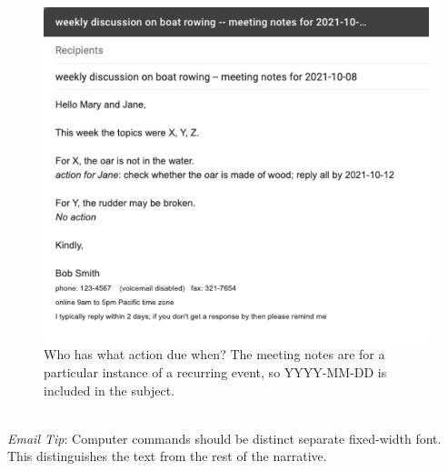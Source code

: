 \begin{figure}
\includegraphics[width=1\textwidth]{images/email_meeting_notes.pdf}
\caption{Who has what action due when? The meeting notes are for a particular instance of a recurring event, so YYYY-MM-DD is included in the subject.}
\label{fig:email_meeting_notes}
\end{figure}

\ \\
\textit{Email Tip}: Computer commands should be distinct separate fixed-width font. This distinguishes the text from the rest of the narrative. 


